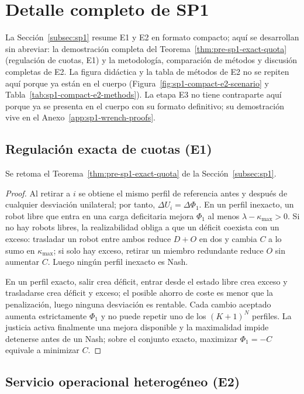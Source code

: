 \section{Detalle completo de SP1}
\label{app:sp1-full-detail}

La Sección~\ref{subsec:sp1} resume E1 y E2 en formato compacto; aquí se
desarrollan sin abreviar: la demostración completa del
Teorema~\ref{thm:pre-sp1-exact-quota} (regulación de cuotas, E1) y la
metodología, comparación de métodos y discusión completas de E2. La figura
didáctica y la tabla de métodos de E2 no se repiten aquí porque ya están en
el cuerpo (Figura~\ref{fig:sp1-compact-e2-scenario} y
Tabla~\ref{tab:sp1-compact-e2-methods}). La etapa E3 no tiene contraparte
aquí porque ya se presenta en el cuerpo con su formato definitivo; su
demostración vive en el Anexo~\ref{app:sp1-wrench-proofs}.

\subsection{Regulación exacta de cuotas (E1)}
\label{app:sp1-e1-full-proof}

Se retoma el Teorema~\ref{thm:pre-sp1-exact-quota} de la Sección~\ref{subsec:sp1}.

\begin{proof}
Al retirar a $i$ se obtiene el mismo perfil de referencia antes y después de cualquier desviación unilateral; por tanto, $\Delta U_i=\Delta\Phi_1$. En un perfil inexacto, un robot libre que entra en una carga deficitaria mejora $\Phi_1$ al menos $\lambda-\kappa_{\max}>0$. Si no hay robots libres, la realizabilidad obliga a que un déficit coexista con un exceso: trasladar un robot entre ambos reduce $D+O$ en dos y cambia $C$ a lo sumo en $\kappa_{\max}$; si solo hay exceso, retirar un miembro redundante reduce $O$ sin aumentar $C$. Luego ningún perfil inexacto es Nash.

En un perfil exacto, salir crea déficit, entrar desde el estado libre crea exceso y trasladarse crea déficit y exceso; el posible ahorro de coste es menor que la penalización, luego ninguna desviación es rentable. Cada cambio aceptado aumenta estrictamente $\Phi_1$ y no puede repetir uno de los $(K+1)^N$ perfiles. La justicia activa finalmente una mejora disponible y la maximalidad impide detenerse antes de un Nash; sobre el conjunto exacto, maximizar $\Phi_1=-C$ equivale a minimizar $C$.
\end{proof}

\subsection{Servicio operacional heterogéneo (E2)}
\label{app:sp1-e2-full-detail}


